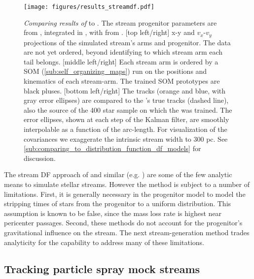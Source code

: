 \documentclass[fleqn,usenatbib]{mnras}
\begin{document}
    \begin{figure*}
      \centering
      \texttt{[image: figures/results\_streamdf.pdf]}
      \caption{ 
        \emph{Comparing results of \galpystreamdf{}} \citep{Bovy2014} to
        \trackstream{}. The stream progenitor parameters are 
        from \citet{Vasiliev2019}, integrated in \galpyMWPotential{}
        \citep{Bovy2015}, with \galpystreamdf{} from \citet{Bovy2014}.
        [top left/right] x-y and $v_x$-$v_y$ projections of the simulated
        stream's arms and progenitor. The data are not yet ordered, beyond
        identifying to which stream arm each tail belongs.
        [middle left/right] Each stream arm is ordered by a SOM
        (\autoref{sub:self_organizing_maps}) run on the positions and kinematics
        of each stream-arm. The trained SOM prototypes are black pluses.
        [bottom left/right] The \trackstream{} tracks (orange and blue, with
        gray error ellipses) are compared to the \galpystreamdf's true tracks
        (dashed line), also the source of the 400 star sample on which the
        \trackstream{} was trained. The error ellipses, shown at each step of
        the Kalman filter, are smoothly interpolable as a function of the
        arc-length. For visualization of the covariances we exaggerate the
        intrinsic stream width to 300 pc. See
        \autoref{sub:comparing_to_distribution_function_df_models} for
        discussion.
        \label{fig:results_streamdf}
      }
    \end{figure*}

    The stream DF approach of \citet{Bovy2014} and similar (e.g.
    \citet{Sanders:2014}) are some of the few analytic means to simulate stellar
    streams. However the method is subject to a number of limitations. First, it
    is generally necessary in the progenitor model to model the stripping times
    of stars from the progenitor to a uniform distribution. This assumption is
    known to be false, since the mass loss rate is highest near pericenter
    passages. Second, these methods do not account for the progenitor's
    gravitational influence on the stream. The next stream-generation method
    trades analyticity for the capability to address many of these limitations.


  \subsection{Tracking particle spray mock streams}
  \label{sub:tracking_particle_spray_mock_streams}
\end{document}

